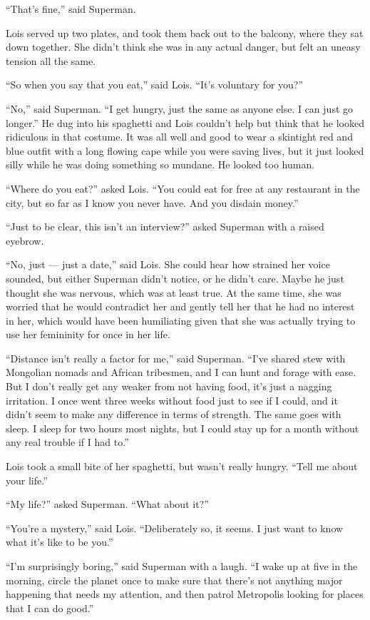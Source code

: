 ``That's fine,'' said Superman.

Lois served up two plates, and took them back out to the balcony, where
they sat down together. She didn't think she was in any actual danger,
but felt an uneasy tension all the same.

``So when you say that you eat,'' said Lois. ``It's voluntary for you?''

``No,'' said Superman. ``I get hungry, just the same as anyone else. I
can just go longer.'' He dug into his spaghetti and Lois couldn't help
but think that he looked ridiculous in that costume. It was all well and
good to wear a skintight red and blue outfit with a long flowing cape
while you were saving lives, but it just looked silly while he was doing
something so mundane. He looked too human.

``Where do you eat?'' asked Lois. ``You could eat for free at any
restaurant in the city, but so far as I know you never have. And you
disdain money.''

``Just to be clear, this isn't an interview?'' asked Superman with a
raised eyebrow.

``No, just --- just a date,'' said Lois. She could hear how strained her
voice sounded, but either Superman didn't notice, or he didn't care.
Maybe he just thought she was nervous, which was at least true. At the
same time, she was worried that he would contradict her and gently tell
her that he had no interest in her, which would have been humiliating
given that she was actually trying to use her femininity for once in her
life.

``Distance isn't really a factor for me,'' said Superman. ``I've shared
stew with Mongolian nomads and African tribesmen, and I can hunt and
forage with ease. But I don't really get any weaker from not having
food, it's just a nagging irritation. I once went three weeks without
food just to see if I could, and it didn't seem to make any difference
in terms of strength. The same goes with sleep. I sleep for two hours
most nights, but I could stay up for a month without any real trouble if
I had to.''

Lois took a small bite of her spaghetti, but wasn't really hungry.
``Tell me about your life.''

``My life?'' asked Superman. ``What about it?''

``You're a mystery,'' said Lois. ``Deliberately so, it seems. I just
want to know what it's like to be you.''

``I'm surprisingly boring,'' said Superman with a laugh. ``I wake up at
five in the morning, circle the planet once to make sure that there's
not anything major happening that needs my attention, and then patrol
Metropolis looking for places that I can do good.''

